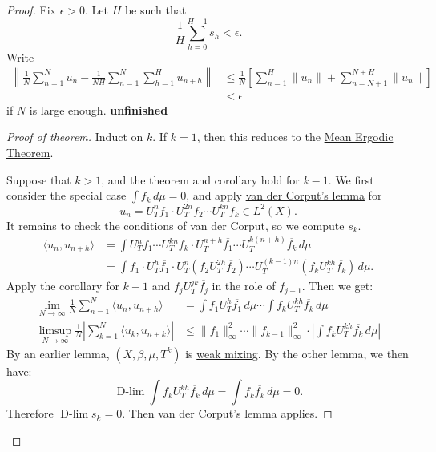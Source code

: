 \documentclass{article}
\DeclareMathOperator*{\dlim}{D-lim}
\begin{document}
\begin{proof}
  Fix $\epsilon > 0$. Let $H$ be such that
  \begin{equation*}
    \frac{1}{H} \sum_{h=0}^{H-1} s_h < \epsilon.
  \end{equation*}
  Write
  \begin{align*}
    \left\| \frac{1}{N} \sum_{n=1}^N u_n - \frac{1}{NH} \sum_{n=1}^N \sum_{h=1}^H u_{n+h} \right\| &\leq \frac{1}{N} \left[\sum_{n=1}^H \|u_n\| + \sum_{n=N+1}^{N+H} \|u_n\|\right] \\
                                                                                                   &< \epsilon
  \end{align*}
  if $N$ is large enough.
  \textbf{unfinished}
\begin{proof}[Proof of theorem]
  Induct on $k$.
  If $k=1$, then this reduces to the \hyperlink{thm:meanet}{Mean Ergodic Theorem}.

  Suppose that $k > 1$, and the theorem and corollary hold for $k-1$.
  We first consider the special case $\int f_k \, d\mu = 0$, and apply \hyperlink{lem:vdC}{van der Corput's lemma} for
  \begin{equation*}
    u_n = U_T^n f_1 \cdot U_T^{2n} f_2 \dotsm U_T^{kn} f_k \in L^2(X).
  \end{equation*}
  It remains to check the conditions of van der Corput, so we compute $s_k$.
  \begin{align*}
    \langle u_n, u_{n+h} \rangle &= \int U_T^n f_1 \dotsm U_T^{kn} f_k \cdot U_T^{n+h} \overline{f_1} \dotsm U_T^{k(n+h)} \overline{f_k} \, d\mu \\
                                 &= \int f_1 \cdot U_T^h \overline{f_1} \cdot U_T^n(f_2 U_T^{2h} \overline{f_2}) \dotsm U_T^{(k-1) n} (f_k U_T^{kh} \overline{f_k}) \, d\mu.
  \end{align*}
  Apply the corollary for $k-1$ and $f_j U_T^{jk} \overline{f_j}$ in the role of $f_{j-1}$.
  Then we get:
  \begin{align*}
    \lim_{N \to \infty} \frac{1}{N} \sum_{n=1}^N \langle u_n, u_{n+h} \rangle &= \int f_1 U_T^h \overline{f_1} \, d\mu \dotsm \int f_k U_T^{kh} \overline{f_k} \, d\mu \\
    \limsup_{N \to \infty} \frac{1}{N} \left|\sum_{k=1}^N \langle u_k, u_{n+k} \rangle \right| &\leq \|f_1\|^2_\infty \dotsm \|f_{k-1}\|^2_\infty \cdot \left|\int f_k U_T^{kh} \overline{f_k} \, d\mu\right|
  \end{align*}
  By an earlier lemma, $(X, \beta, \mu, T^k)$ is \hyperlink{def:wMixing}{weak mixing}.
  By the other lemma, we then have:
  \begin{equation*}
    \dlim \int f_k U_T^{kh} \overline{f_k} \, d\mu = \int f_k \overline{f_k} \,d\mu = 0.
  \end{equation*}
  Therefore $\dlim s_k = 0$.
  Then van der Corput's lemma applies.


\end{proof}
\end{proof}
\end{document}
